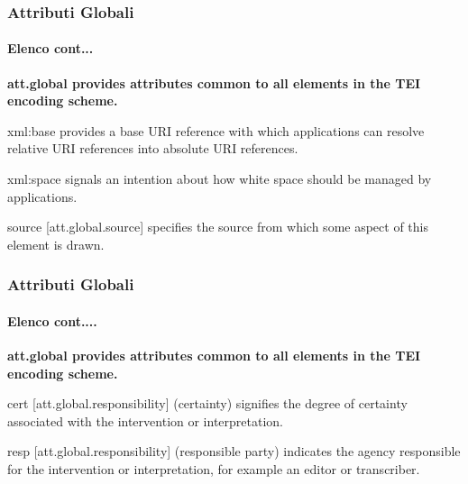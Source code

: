 \begin{frame}
    \frametitle{Attributi Globali}
    \framesubtitle{Elenco cont...}
    \addtocounter{nframe}{1}


\textbf{\textmd{att.global} provides attributes common to all elements in the TEI encoding scheme.}

\begin{description}
    \item xml:base	provides a base URI reference with which applications can resolve relative URI references into absolute URI references.
    \item xml:space	signals an intention about how white space should be managed by applications.
    \item source [att.global.source]	specifies the source from which some aspect of this element is drawn.
\end{description}

\end{frame}

\begin{frame}
    \frametitle{Attributi Globali}
    \framesubtitle{Elenco cont....}
    \addtocounter{nframe}{1}


\textbf{\textmd{att.global} provides attributes common to all elements in the TEI encoding scheme.}

\begin{description}
    \item  cert [att.global.responsibility]	(certainty) signifies the degree of certainty associated with the intervention or interpretation.
    \item resp [att.global.responsibility]	(responsible party) indicates the agency responsible for the intervention or interpretation, for example an editor or transcriber.
\end{description}

\end{frame}



